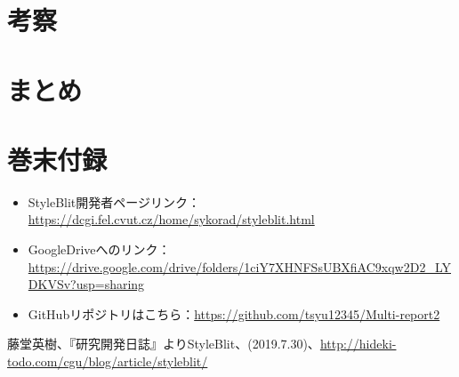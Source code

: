 \documentclass[dvipdfmx]{jsarticle}
\begin{document}
\section{考察}
\section{まとめ}


\section{巻末付録}
\begin{itemize}
  \item StyleBlit開発者ページリンク：\url{https://dcgi.fel.cvut.cz/home/sykorad/styleblit.html}
  \item GoogleDriveへのリンク：\url{https://drive.google.com/drive/folders/1ciY7XHNFSsUBXfiAC9xqw2D2_LYDKVSv?usp=sharing}
  \item GitHubリポジトリはこちら：\url{https://github.com/tsyu12345/Multi-report2}
\end{itemize}
\begin{thebibliography}{99}
   藤堂英樹、『研究開発日誌』よりStyleBlit、(2019.7.30)、\url{http://hideki-todo.com/cgu/blog/article/styleblit/}
\end{thebibliography}
\end{document}
